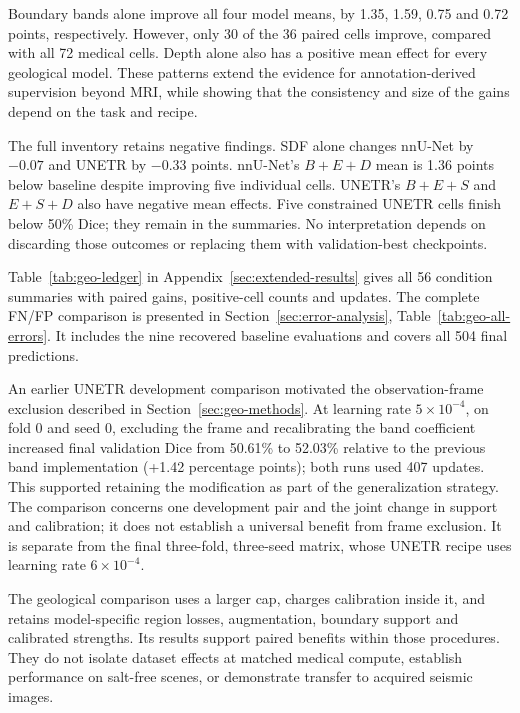 \documentclass[12pt,a4paper]{article}
\begin{document}
Boundary bands alone improve all four model means, by 1.35, 1.59,
0.75 and 0.72 points, respectively. However, only 30 of the 36 paired
cells improve, compared with all 72 medical cells. Depth alone also
has a positive mean effect for every geological model. These patterns
extend the evidence for annotation-derived supervision beyond MRI,
while showing that the consistency and size of the gains depend on
the task and recipe.

The full inventory retains negative findings. SDF alone changes
nnU-Net by $-0.07$ and UNETR by $-0.33$ points. nnU-Net's
$B+E+D$ mean is 1.36 points below baseline despite improving five
individual cells. UNETR's $B+E+S$ and $E+S+D$ also have negative
mean effects. Five constrained UNETR cells finish below 50\% Dice;
they remain in the summaries. No interpretation depends on discarding
those outcomes or replacing them with validation-best checkpoints.

Table~\ref{tab:geo-ledger} in Appendix~\ref{sec:extended-results}
gives all 56 condition summaries with paired gains, positive-cell
counts and updates. The complete FN/FP comparison is presented in
Section~\ref{sec:error-analysis}, Table~\ref{tab:geo-all-errors}.
It includes the nine recovered baseline evaluations and covers all
504 final predictions.

An earlier UNETR development comparison motivated the observation-frame
exclusion described in Section~\ref{sec:geo-methods}. At learning rate
$5\times10^{-4}$, on fold 0 and seed 0, excluding the frame and
recalibrating the band coefficient increased final validation Dice
from 50.61\% to 52.03\% relative to the previous band implementation
(+1.42 percentage points); both runs used 407 updates. This supported
retaining the modification as part of the generalization strategy.
The comparison concerns one development pair and the joint change in
support and calibration; it does not establish a universal benefit
from frame exclusion. It is separate from the final three-fold,
three-seed matrix, whose UNETR recipe uses learning rate
$6\times10^{-4}$.

The geological comparison uses a larger cap, charges calibration
inside it, and retains model-specific region losses, augmentation,
boundary support and calibrated strengths. Its results support paired
benefits within those procedures. They do not isolate dataset effects
at matched medical compute, establish performance on salt-free scenes,
or demonstrate transfer to acquired seismic images.
\end{document}
